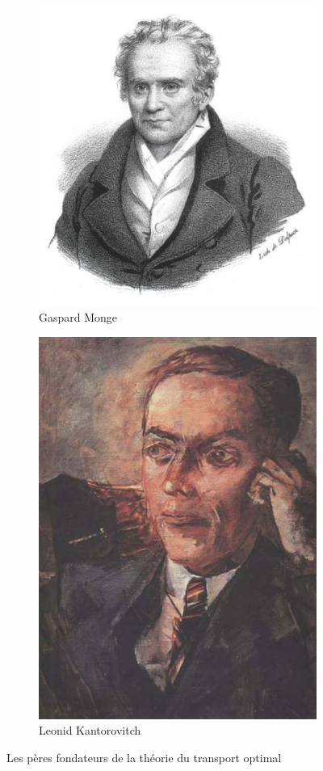 \documentclass[a4paper,12pt]{article}
\begin{document}
\begin{figure}[!h]
\centering
\begin{subfigure}[b]{0.30\linewidth}
\includegraphics[width=\linewidth]{img/monge.jpg}
\caption*{Gaspard Monge}
\end{subfigure}
\hspace{3cm}
\begin{subfigure}[b]{0.30\linewidth}
\centering
\includegraphics[width=0.8\linewidth]{img/kantorovitch.jpg}
\hspace{-2cm}\caption*{Leonid Kantorovitch}
\end{subfigure}
\caption{Les pères fondateurs de la théorie du transport optimal}
\end{figure}
\end{document}
